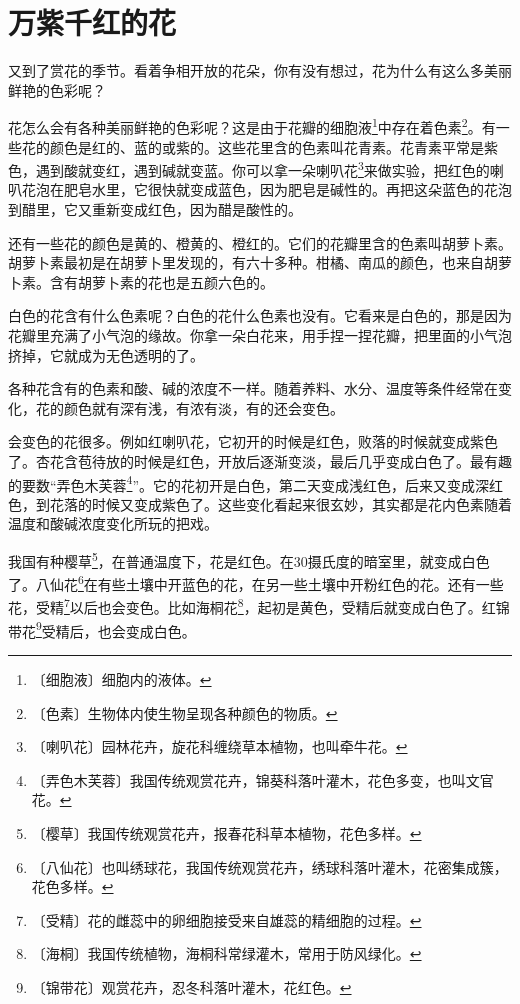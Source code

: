 \documentclass[12pt,UTF-8,openany]{ctexbook}
\begin{document}
\chapter{万紫千红的花}

\begin{large}
    
    又到了赏花的季节。看着争相开放的花朵，你有没有想过，花为什么有这么多美丽鲜艳的色彩呢？
    
    花怎么会有各种美丽鲜艳的色彩呢？这是由于花瓣的细胞液\footnote{〔细胞液〕细胞内的液体。}中存在着色素\footnote{〔色素〕生物体内使生物呈现各种颜色的物质。}。有一些花的颜色是红的、蓝的或紫的。这些花里含的色素叫花青素。花青素平常是紫色，遇到酸就变红，遇到碱就变蓝。你可以拿一朵喇叭花\footnote{〔喇叭花〕园林花卉，旋花科缠绕草本植物，也叫牵牛花。}来做实验，把红色的喇叭花泡在肥皂水里，它很快就变成蓝色，因为肥皂是碱性的。再把这朵蓝色的花泡到醋里，它又重新变成红色，因为醋是酸性的。
    
    还有一些花的颜色是黄的、橙黄的、橙红的。它们的花瓣里含的色素叫胡萝卜素。胡萝卜素最初是在胡萝卜里发现的，有六十多种。柑橘、南瓜的颜色，也来自胡萝卜素。含有胡萝卜素的花也是五颜六色的。
    
    白色的花含有什么色素呢？白色的花什么色素也没有。它看来是白色的，那是因为花瓣里充满了小气泡的缘故。你拿一朵白花来，用手捏一捏花瓣，把里面的小气泡挤掉，它就成为无色透明的了。
    
    各种花含有的色素和酸、碱的浓度不一样。随着养料、水分、温度等条件经常在变化，花的颜色就有深有浅，有浓有淡，有的还会变色。
    
    会变色的花很多。例如红喇叭花，它初开的时候是红色，败落的时候就变成紫色了。杏花含苞待放的时候是红色，开放后逐渐变淡，最后几乎变成白色了。最有趣的要数“弄色木芙蓉\footnote{〔弄色木芙蓉〕我国传统观赏花卉，锦葵科落叶灌木，花色多变，也叫文官花。}”。它的花初开是白色，第二天变成浅红色，后来又变成深红色，到花落的时候又变成紫色了。这些变化看起来很玄妙，其实都是花内色素随着温度和酸碱浓度变化所玩的把戏。
    
    我国有种樱草\footnote{〔樱草〕我国传统观赏花卉，报春花科草本植物，花色多样。}，在普通温度下，花是红色。在30摄氏度的暗室里，就变成白色了。八仙花\footnote{〔八仙花〕也叫绣球花，我国传统观赏花卉，绣球科落叶灌木，花密集成簇，花色多样。}在有些土壤中开蓝色的花，在另一些土壤中开粉红色的花。还有一些花，受精\footnote{〔受精〕花的雌蕊中的卵细胞接受来自雄蕊的精细胞的过程。}以后也会变色。比如海桐花\footnote{〔海桐〕我国传统植物，海桐科常绿灌木，常用于防风绿化。}，起初是黄色，受精后就变成白色了。红锦带花\footnote{〔锦带花〕观赏花卉，忍冬科落叶灌木，花红色。}受精后，也会变成白色。
    

\end{large}
\end{document}
